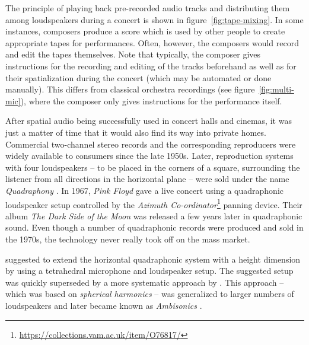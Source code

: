 The principle of playing back pre-recorded audio tracks
and distributing them among loudspeakers during a concert
is shown in figure~\ref{fig:tape-mixing}.
In some instances, composers produce a score
which is used by other people to create appropriate tapes for performances.
Often, however, the composers would record and edit the tapes themselves.
Note that typically,
the composer gives instructions for
the recording and editing of the tracks beforehand
as well as for their spatialization during the concert
(which may be automated or done manually).
This differs from classical orchestra recordings
(see figure~\ref{fig:multi-mic}),
where the composer only gives instructions for the performance itself.

After spatial audio being successfully used in concert halls and cinemas,
it was just a matter of time that it would also find its way into private homes.
Commercial two-channel stereo records and the corresponding reproducers
were widely available to consumers since the late 1950s.
Later, reproduction systems with four loudspeakers --
to be placed in the corners of a square,
surrounding the listener from all directions in the horizontal plane --
were sold under the name \emph{Quadraphony}
\parencite{woodward1977quadraphony}.
In 1967, \emph{Pink Floyd} gave a live concert
using a quadraphonic loudspeaker setup
controlled by the \emph{Azimuth Co-ordinator}\footnote{%
\url{https://collections.vam.ac.uk/item/O76817/}}
panning device.
Their album \emph{The Dark Side of the Moon}
was released a few years later in quadraphonic sound.
Even though a number of quadraphonic records were produced and sold in the 1970s,
the technology never really took off on the mass market.

\textcite{cooper1970tetrahedral}
suggested to extend the horizontal quadraphonic system
with a height dimension
by using a tetrahedral microphone and loudspeaker setup.
The suggested setup was quickly superseded by a more systematic approach by
\textcite{gerzon1970quadraphonic_part_two}.
This approach --
which was based on \emph{spherical harmonics} --
was generalized to larger numbers of loudspeakers
\parencite{gerzon1973periphony}
and later became known as \emph{Ambisonics}
\parencite{fellgett1975ambisonics1,gerzon1975ambisonics2}.

